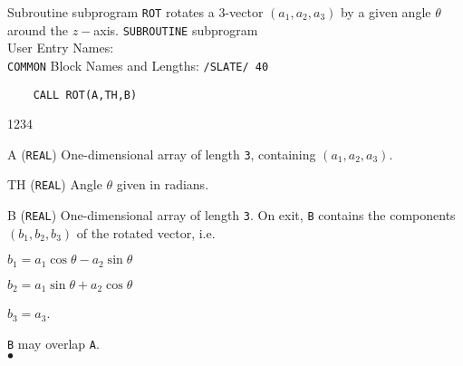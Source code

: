                              
                   
                     
Subroutine subprogram {\tt ROT} rotates a 3-vector $(a_1,a_2,a_3)$
by a given angle $\theta$ around the $z-$axis.
\Structure
{\tt SUBROUTINE} subprogram \\
User Entry Names: \\
{\tt COMMON} Block Names and Lengths: {\tt /SLATE/ 40}
\Usage
\begin{verbatim}
    CALL ROT(A,TH,B)
\end{verbatim}
\begin{DLtt}{1234}
\item [A] ({\tt REAL}) One-dimensional array of length {\tt 3},
containing $(a_1,a_2,a_3)$.
\item [TH] ({\tt REAL}) Angle $\theta$ given in radians.
\item [B]  ({\tt REAL}) One-dimensional array of length {\tt 3}. On exit,
{\tt B} contains the components $(b_1,b_2,b_3)$ of the rotated vector,
i.e.
\item [] $b_1=a_1\cos \theta -a_2\sin \theta$
\item [] $b_2=a_1\sin \theta +a_2\cos \theta$
\item [] $b_3=a_3$.
\end{DLtt}
{\tt B} may overlap {\tt A}.
\\ $\bullet$

